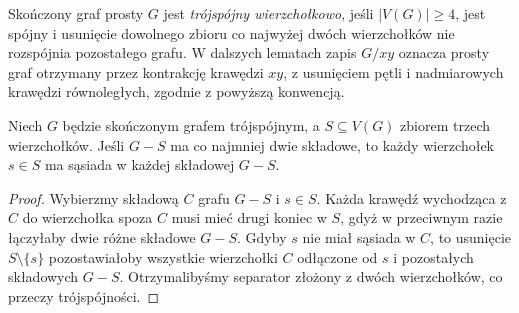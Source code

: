 \begin{definicja}[Trójspójność]
\label{def:tg-kuratowski-threeconnected}
Skończony graf prosty $G$ jest
\emph{trójspójny wierzchołkowo},
jeśli $|V(G)|\geq4$, jest spójny
i usunięcie dowolnego zbioru
co najwyżej dwóch wierzchołków
nie rozspójnia pozostałego grafu.
W dalszych lematach zapis $G/xy$ oznacza prosty
graf otrzymany przez kontrakcję krawędzi $xy$,
z usunięciem pętli i nadmiarowych krawędzi
równoległych, zgodnie z powyższą konwencją.
\end{definicja}

\begin{lemat}
\label{lem:tg-kuratowski-threecut}
Niech $G$ będzie skończonym
grafem trójspójnym,
a $S\subseteq V(G)$
zbiorem trzech wierzchołków.
Jeśli $G-S$ ma co najmniej
dwie składowe, to każdy
wierzchołek $s\in S$ ma
sąsiada w każdej
składowej $G-S$.
\end{lemat}
\begin{proof}
Wybierzmy składową $C$ grafu
$G-S$ i $s\in S$. Każda krawędź wychodząca
z $C$ do wierzchołka spoza $C$ musi mieć
drugi koniec w $S$, gdyż w przeciwnym razie
łączyłaby dwie różne składowe $G-S$.
Gdyby $s$ nie miał
sąsiada w $C$,
to usunięcie $S\setminus\{s\}$
pozostawiałoby wszystkie
wierzchołki $C$ odłączone
od $s$ i pozostałych
składowych $G-S$.
Otrzymalibyśmy separator
złożony z dwóch wierzchołków,
co przeczy trójspójności.
\end{proof}

